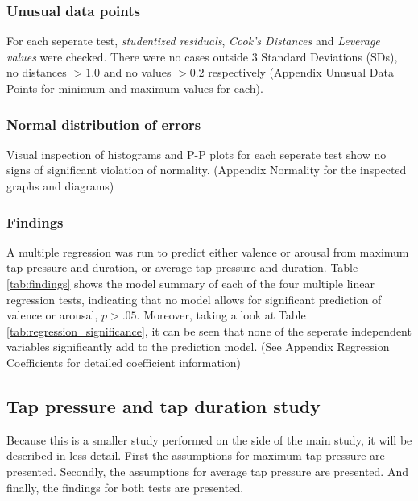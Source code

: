 \documentclass{sigchi}
\begin{document}
\subsubsection{Unusual data points} %
\label{subsub:unusual_data_points}
For each seperate test, \textit{studentized residuals}, \textit{Cook's Distances} and \textit{Leverage values} were checked. There were no cases outside 3 Standard Deviations (SDs), no distances $> 1.0$ and no values $> 0.2$ respectively (Appendix Unusual Data Points for minimum and maximum values for each).

\subsubsection{Normal distribution of errors} %
\label{subsub:normal_distribution_of_errors}
Visual inspection of histograms and P-P plots for each seperate test show no signs of significant violation of normality. (Appendix Normality for the inspected graphs and diagrams)

\subsubsection{Findings} %
\label{sub:findings}
A multiple regression was run to predict either valence or arousal from maximum tap pressure and duration, or average tap pressure and duration. Table \ref{tab:findings} shows the model summary of each of the four multiple linear regression tests, indicating that no model allows for significant prediction of valence or arousal, $p > .05$. Moreover, taking a look at Table \ref{tab:regression_significance}, it can be seen that none of the seperate independent variables significantly add to the prediction model. (See Appendix Regression Coefficients for detailed coefficient information)



\subsection{Tap pressure and tap duration study}
Because this is a smaller study performed on the side of the main study, it will be described in less detail. First the assumptions for maximum tap pressure are presented. Secondly, the assumptions for average tap pressure are presented. And finally, the findings for both tests are presented.
\end{document}
